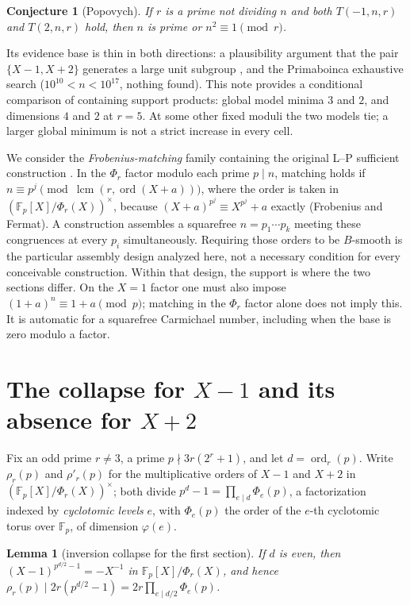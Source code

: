 \documentclass[11pt]{article}
\newtheorem{lemma}[theorem]{Lemma}
\newtheorem{conjecture}[theorem]{Conjecture}
\theoremstyle{remark}
\newcommand{\F}{\mathbb{F}}
\DeclareMathOperator{\lcm}{lcm}
\DeclareMathOperator{\ord}{ord}
\begin{document}
\begin{conjecture}[Popovych]\label{conj:pop}
If $r$ is a prime not dividing $n$ and both $T(-1, n, r)$ and
$T(2, n, r)$ hold, then $n$ is prime or $n^2 \equiv 1 \pmod r$.
\end{conjecture}

Its evidence base is thin in both directions: a plausibility argument
that the pair $\{X - 1, X + 2\}$ generates a large unit subgroup
\cite{Popovych09,Popovych12}, and the Primaboinca exhaustive search
($10^{10}<n<10^{17}$, nothing found). This note provides a conditional
comparison of containing support products: global model minima $3$ and $2$,
and dimensions $4$ and $2$ at $r=5$. At some other fixed moduli the two
models tie; a larger global minimum is not a strict increase in every cell.

We consider the \emph{Frobenius-matching} family containing the original
L--P sufficient construction \cite{LPremarks}. In the $\Phi_r$ factor
modulo each prime $p\mid n$, matching holds if $n\equiv
p^{j} \pmod{\lcm(r, \ord(X + a))}$, where the order is taken in
$(\F_p[X]/\Phi_r(X))^\times$, because $(X + a)^{p^j} \equiv X^{p^j} + a$
exactly (Frobenius and Fermat). A construction assembles a squarefree
$n = p_1 \cdots p_k$ meeting these congruences at every $p_i$
simultaneously. Requiring those orders to be $B$-smooth is the particular
assembly design analyzed here, not a necessary condition for every
conceivable construction. Within that design, the
support is where the two sections differ. On the $X=1$ factor one must also
impose $(1+a)^n\equiv1+a\pmod p$; matching in the $\Phi_r$ factor alone does
not imply this. It is automatic for a squarefree Carmichael number, including
when the base is zero modulo a factor.

\section{The collapse for $X - 1$ and its absence for $X + 2$}

Fix an odd prime $r \ne 3$, a prime $p \nmid 3r(2^r + 1)$, and let
$d = \ord_r(p)$. Write $\rho_r(p)$ and $\rho'_r(p)$ for the
multiplicative orders of $X - 1$ and $X + 2$ in
$(\F_p[X]/\Phi_r(X))^\times$; both divide $p^d - 1 = \prod_{e \mid d}
\Phi_e(p)$, a factorization indexed by \emph{cyclotomic levels} $e$,
with $\Phi_e(p)$ the order of the $e$-th cyclotomic torus over $\F_p$,
of dimension $\varphi(e)$.

\begin{lemma}[inversion collapse for the first section]\label{lem:collapse}
If $d$ is even, then $(X-1)^{p^{d/2} - 1} = -X^{-1}$ in
$\F_p[X]/\Phi_r(X)$, and hence $\rho_r(p) \mid 2r(p^{d/2} - 1) =
2r \prod_{e \mid d/2} \Phi_e(p)$.
\end{lemma}
\end{document}
